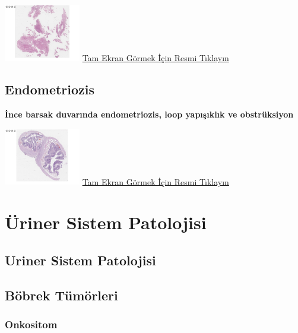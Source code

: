 \documentclass[
  letterpaper,
  DIV=11,
  numbers=noendperiod]{scrreprt}
\begin{document}
\href{https://images.patolojiatlasi.com/endometrial-polyp/HE.html}{\includegraphics[width=0.25\textwidth,height=\textheight]{./screenshots/endometrial-polyp_screenshot.png}}
\href{https://images.patolojiatlasi.com/endometrial-polyp/HE.html}{Tam
Ekran Görmek İçin Resmi Tıklayın}

\hypertarget{sec-endometriozis}{%
\chapter{Endometriozis}\label{sec-endometriozis}}

\textbf{İnce barsak duvarında endometriozis, loop yapışıklık ve
obstrüksiyon}

\href{https://images.patolojiatlasi.com/endometriosis/HE.html}{\includegraphics[width=0.25\textwidth,height=\textheight]{./screenshots/endometriosis_screenshot.png}}
\href{https://images.patolojiatlasi.com/endometriosis/HE.html}{Tam Ekran
Görmek İçin Resmi Tıklayın}

\part{Üriner Sistem Patolojisi}

\hypertarget{sec-uriner-sistem-patolojisi}{%
\chapter{Uriner Sistem Patolojisi}\label{sec-uriner-sistem-patolojisi}}

\hypertarget{sec-bobrek-tumorleri}{%
\chapter{Böbrek Tümörleri}\label{sec-bobrek-tumorleri}}

\hypertarget{sec-bobrek-onkositom}{%
\section{Onkositom}\label{sec-bobrek-onkositom}}
\end{document}
